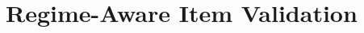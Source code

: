 \documentclass[12pt,a4paper,oneside]{report}
\begin{document}
\section{Regime-Aware Item Validation}
\label{sec:regime}
\end{document}
